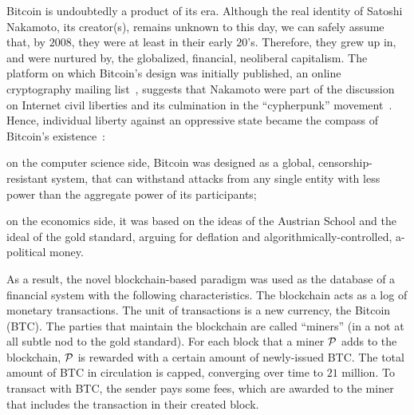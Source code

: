Bitcoin is undoubtedly a product of its era. Although the real identity of
Satoshi Nakamoto, its creator(s), remains unknown to this day, we can safely
assume that, by $2008$, they were at least in their early $20$'s. Therefore,
they grew up in, and were nurtured by, the globalized, financial, neoliberal
capitalism. The platform on which Bitcoin's design was initially published, an
online cryptography mailing
list~\cite{nakamoto2008mail}, suggests that Nakamoto were part of the discussion on
Internet civil liberties and its culmination in the ``cypherpunk''
movement~\cite{greenberg2012machine,levy2001crypto,assange2012cypherpunks,manne2011cypherpunk}.
Hence, individual liberty against an oppressive state became the compass of
Bitcoin's existence~\cite{golumbia2016politics}:
\begin{inparaenum}[i)]
    \item on the computer science side, Bitcoin was designed as a global,
        censorship-resistant system, that can withstand attacks from any single
        entity with less power than the aggregate power of its participants;
    \item on the economics side, it was based on the ideas of the Austrian
        School and the ideal of the gold standard, arguing for deflation and
        algorithmically-controlled, a-political money.
\end{inparaenum}

As a result, the novel blockchain-based paradigm was used as the database of a
financial system with the following characteristics. The blockchain acts as a
log of monetary transactions. The unit of transactions is a new currency, the
Bitcoin (BTC). The parties that maintain the blockchain are called ``miners''
(in a not at all subtle nod to the gold standard). For each block that a miner
$\mathcal{P}$ adds to the blockchain, $\mathcal{P}$ is rewarded with a certain amount of
newly-issued BTC. The total amount of BTC in circulation is capped, converging
over time to $21$ million. To transact with BTC, the sender pays some fees,
which are awarded to the miner that includes the transaction in their created
block.

